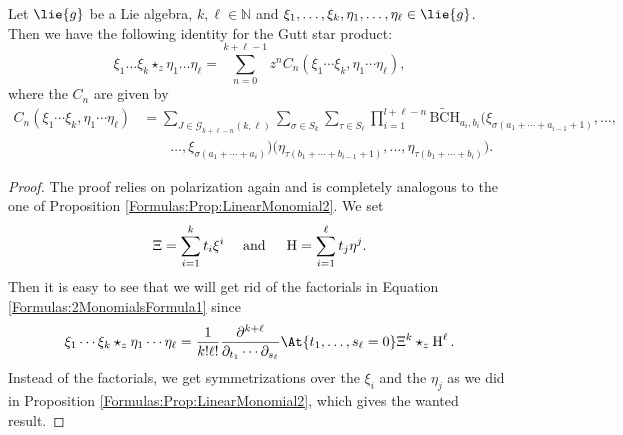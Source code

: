 \begin{proposition}
	\label{Formulas:Prop:2MonomialsFormula2}
	Let $\lie{g}$ be a Lie algebra, $k, \ell \in \mathbb{N}$ and $\xi_1, 
	\ldots, \xi_k, \eta_1, \ldots, \eta_{\ell} \in \lie{g}$. Then we 
	have the following identity for the Gutt star product:
	\begin{equation*}
    		\xi_1 \ldots \xi_k \star_z \eta_1 \ldots \eta_{\ell}
    		=
		\sum\limits_{n=0}^{k + \ell -1}
    		z^n C_n
    		\left( 
    			\xi_1 \cdots \xi_k, \eta_1 \cdots \eta_{\ell}
    		\right),
	\end{equation*}
	where the $C_n$ are given by
	\begin{align}
		\nonumber
        C_n
        \left( 
    			\xi_1 \cdots \xi_k, \eta_1 \cdots \eta_{\ell}
    		\right)
        & =
        \sum\limits_{J \in \mathcal{G}_{k + \ell - n}(k, \ell)}
        \sum\limits_{\sigma \in S_k}
        \sum\limits_{\tau \in S_{\ell}}
        \prod_{i=1}^{l + \ell - n}
        \widetilde{\mathrm{BCH}}_{a_i, b_i}
        \big( \xi_{\sigma(a_1 + \cdots + a_{i - 1} + 1)}, 
            \ldots, 
        \\
        \label{Formulas:2MonomialsFormula2}
        & \qquad            
            \ldots, \xi_{\sigma(a_1 + \cdots + a_i)} \big)
        \big( \eta_{\tau(b_1 + \cdots + b_{i - 1} + 1)}, 
            \ldots, \eta_{\tau(b_1 + \cdots + b_i)} \big).
	\end{align}
\end{proposition}
\begin{proof}
	The proof relies on polarization again and is completely analogous 
	to the one of Proposition \ref{Formulas:Prop:LinearMonomial2}. We set
	\begin{equation*}
		\Xi
		=
		\sum\limits_{i=1}^k t_i \xi^i
		\quad \text{ and } \quad
		\operatorname{H}
		=
		\sum\limits_{i=1}^{\ell} t_j \eta^j
		.
	\end{equation*}
	Then it is easy to see that we will get rid of the factorials in Equation 
	\eqref{Formulas:2MonomialsFormula1} since
	\begin{equation*}
		\xi_1 \cdots \xi_k \star_z \eta_1 \cdots \eta_{\ell}
		=
		\frac{1}{k! \ell!}
		\frac{\partial^{k + \ell}}
		{\partial_{t_1} \cdots \partial_{s_{\ell}}}
		\At{t_1, \ldots, s_{\ell} = 0}
		\Xi^k \star_z \Eta^{\ell}.
	\end{equation*}
	Instead of the factorials, we get symmetrizations over the 
	$\xi_i$ and the $\eta_j$ as we did in Proposition 
	\ref{Formulas:Prop:LinearMonomial2}, which gives the wanted result.
\end{proof}



